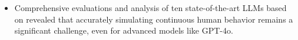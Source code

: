 \begin{itemize}
    \item
Comprehensive evaluations and analysis of ten state-of-the-art LLMs based on \datasetname revealed that accurately simulating continuous human behavior remains a significant challenge, even for advanced models like GPT-4o.



 


 
   

    \end{itemize}




